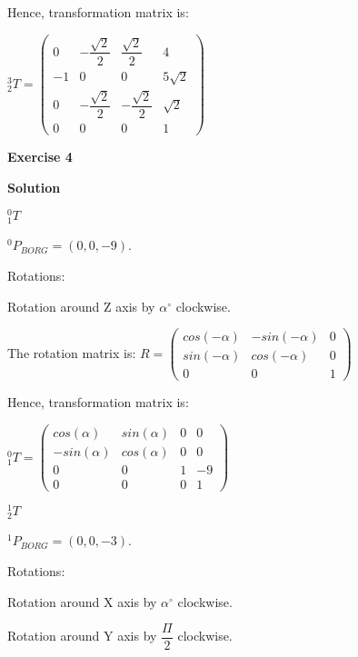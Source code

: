 \documentclass[12pt]{article}
\begin{document}
Hence, transformation matrix is:

$_{2}^{3}T = \left(\begin{array}{cccc}
0 & - \dfrac{\sqrt{2}}{2} & \dfrac{\sqrt{2}}{2} & 4 \\
-1 & 0 & 0 & 5\sqrt{2}\\
0 & - \dfrac{\sqrt{2}}{2} & - \dfrac{\sqrt{2}}{2} & \sqrt{2}\\
0 & 0 & 0 & 1\end{array}\right)$

\newpage

\textbf{Exercise 4}		
		
\textbf{Solution}

\begin{list}{)~}{}
\item
$_{1}^{0}T$

$^0 P_{BORG} = \left(0, 0, -9\right)$.

Rotations:

\begin{list}{)~}{}
\item
Rotation around Z axis by $\alpha^\circ$ clockwise.
\end{list}

The rotation matrix is:
$R=\left(\begin{array}{ccc}
cos\left(-\alpha\right) & -sin\left(-\alpha\right) & 0 \\
sin\left(-\alpha\right) & cos\left(-\alpha\right) & 0\\
0 & 0 & 1\end{array}\right)$

Hence, transformation matrix is:

$_{1}^{0}T = \left(\begin{array}{cccc}
cos\left(\alpha\right) & sin\left(\alpha\right) & 0 & 0 \\
-sin\left(\alpha\right) & cos\left(\alpha\right) & 0 & 0\\
0 & 0 & 1 & -9\\
0 & 0 & 0 & 1\end{array}\right)$

\item
$_{2}^{1}T$

$^1 P_{BORG} = \left(0, 0, -3\right)$.

Rotations:

\begin{list}{)~}{}
\item Rotation around X axis by $\alpha^\circ$ clockwise.
\item Rotation around Y axis by $\dfrac{\Pi}{2}$ clockwise.
\end{list}


\end{list}
\end{document}
